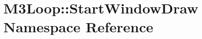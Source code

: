 \hypertarget{namespaceM3Loop_1_1StartWindowDraw}{}\section{M3\+Loop\+:\+:Start\+Window\+Draw Namespace Reference}
\label{namespaceM3Loop_1_1StartWindowDraw}
